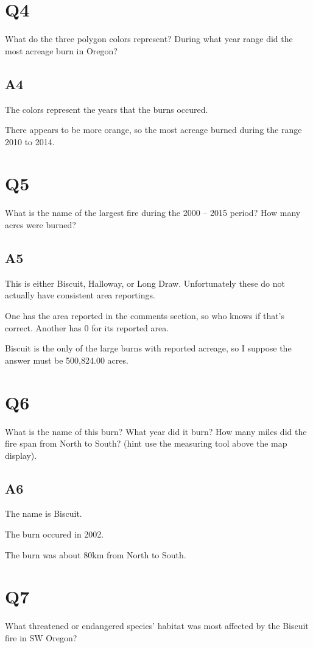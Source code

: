 \documentclass{article}
\begin{document}
\section*{Q4}
What do the three polygon colors represent? During what year range did the
most acreage burn in Oregon?

\subsection*{A4}
The colors represent the years that the burns occured.

There appears to be more orange, so the most acreage burned during the range 2010 to 2014.

\section*{Q5}
What is the name of the largest fire during the 2000 – 2015 period? How
many acres were burned?

\subsection*{A5}
This is either Biscuit, Halloway, or Long Draw. Unfortunately these do not actually have consistent area reportings. 

One has the area reported in the comments section, so who knows if that's correct. Another has 0 for its reported area.

Biscuit is the only of the large burns with reported acreage, so I suppose the answer must be 500,824.00 acres.

\section*{Q6}
What is the name of this burn? What year did it burn? How many miles did
the fire span from North to South? (hint use the measuring tool above the map display).


\subsection*{A6}
The name is Biscuit. 

The burn occured in 2002.

The burn was about 80km from North to South.

\newpage

\section*{Q7}
What threatened or endangered species’ habitat was most affected by the
Biscuit fire in SW Oregon?
\end{document}
